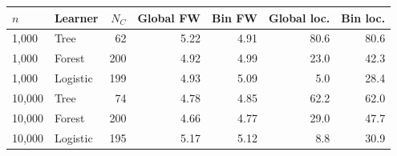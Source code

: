 \begin{tabular}{llrrrrr}
\toprule
$n$ & Learner & $N_C$ & Global FW & Bin FW & Global loc. & Bin loc. \\
\midrule
1,000 & Tree & 62 & 5.22 & 4.91 & 80.6 & 80.6 \\
1,000 & Forest & 200 & 4.92 & 4.99 & 23.0 & 42.3 \\
1,000 & Logistic & 199 & 4.93 & 5.09 & 5.0 & 28.4 \\
10,000 & Tree & 74 & 4.78 & 4.85 & 62.2 & 62.0 \\
10,000 & Forest & 200 & 4.66 & 4.77 & 29.0 & 47.7 \\
10,000 & Logistic & 195 & 5.17 & 5.12 & 8.8 & 30.9 \\
\bottomrule
\end{tabular}
